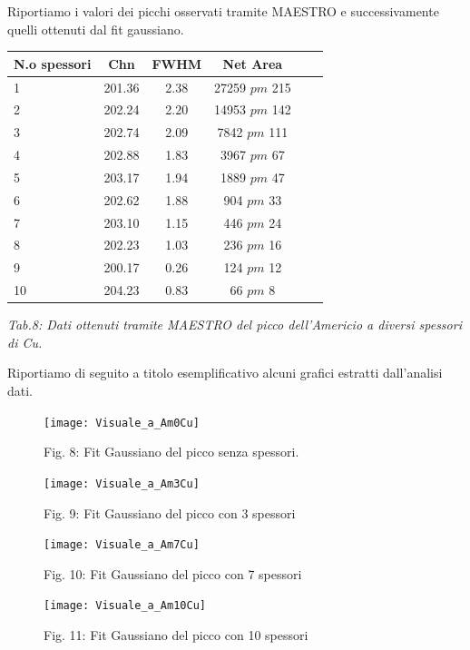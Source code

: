 \documentclass[a4paper]{article}
\begin{document}
Riportiamo i valori dei picchi osservati tramite MAESTRO e successivamente quelli ottenuti dal fit gaussiano.

\begin{center} 
		
		\begin{tabular}{lccccc}
			\hline
			\hline
			\textbf{N.o spessori} & \textbf{Chn}  &   \textbf{FWHM}   & \textbf{Net Area}	\\
			\hline
			\hline
				      1 &  201.36   & 2.38  &  27259	$pm$	215	\\
				      2 &  202.24   & 2.20	&  14953	$pm$	142 \\
				      3 &  202.74	& 2.09	&  7842		$pm$	111 \\
				      4 &  202.88	& 1.83	&  3967	$pm$	67 \\
				      5 &  203.17	& 1.94	&  1889	$pm$	47 \\
				      6 &  202.62	& 1.88	&  904	$pm$	33 \\
				      7 &  203.10	& 1.15	&  446	$pm$	24 \\
				      8 &  202.23	& 1.03	&  236	$pm$	16 \\
				      9 &  200.17	& 0.26	&  124	$pm$	12 \\
				      10 & 204.23	& 0.83	&  66	$pm$	8 \\
			\hline
			\hline
		\end{tabular}
		\linebreak
		\emph{Tab.8: Dati ottenuti tramite MAESTRO del picco dell'Americio a diversi spessori di Cu.} 
	\end{center}
 Riportiamo di seguito a titolo esemplificativo alcuni grafici estratti dall'analisi dati.
 
 \begin{figure}[!h]
\texttt{[image: Visuale\_a\_Am0Cu]}
        \caption{Fig. 8: Fit Gaussiano del picco senza spessori.}
        \label{fig:16}
\texttt{[image: Visuale\_a\_Am3Cu]}
        \caption{Fig. 9: Fit Gaussiano del picco con 3 spessori}
        \label{fig:17}
\end{figure}
\begin{figure}[!h]
\texttt{[image: Visuale\_a\_Am7Cu]}
        \caption{Fig. 10: Fit Gaussiano del picco con 7 spessori}
        \label{fig:18}
\texttt{[image: Visuale\_a\_Am10Cu]}
        \caption{Fig. 11: Fit Gaussiano del picco con 10 spessori}
        \label{fig:19}        
\end{figure} 

\newpage
\end{document}
